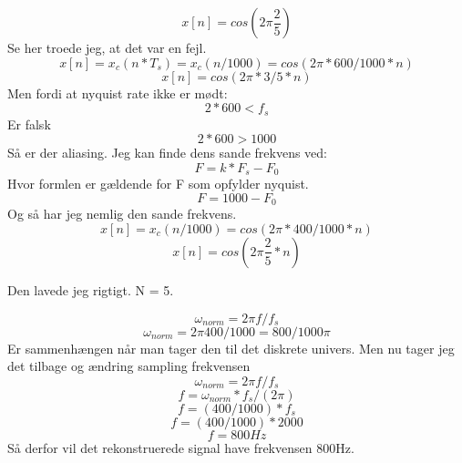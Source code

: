 \begin{rubrik}
\begin{eksamensOpgave}
    \end{eksamensOpgave}
    \begin{eksamensOpgave}
        \begin{UnderOpgave}
            \[x[n] = cos(2\pi \frac{2}{5})\]
            Se her troede jeg, at det var en fejl. 
            \[x[n] = x_c(n*T_s) = x_c(n/1000) = cos(2\pi * 600/1000 * n)\]
            \[x[n] = cos(2\pi*3/5 * n)\]
            Men fordi at nyquist rate ikke er mødt: 
            \[2 * 600 < f_s\]
            Er falsk
            \[2 * 600 > 1000\]
            Så er der aliasing. 
            Jeg kan finde dens sande frekvens ved: 
            \[F = k*F_s - F_0\]
            Hvor formlen er gældende for F som opfylder nyquist. 
            \[F = 1000 - F_0\]
            Og så har jeg nemlig den sande frekvens.
            \[x[n] = x_c(n/1000) = cos(2\pi * 400/1000 * n)\]
            \[x[n] = cos(2\pi \frac{2}{5} * n)\]
        \end{UnderOpgave}
        \begin{UnderOpgave}
            Den lavede jeg rigtigt. N = 5.
        \end{UnderOpgave}
        \begin{UnderOpgave}
            \[\omega_{norm} = 2\pi f/f_s\]
            \[\omega_{norm} = 2\pi 400/1000 = 800/1000\pi\]
            Er sammenhængen når man tager den til det diskrete univers. 
            Men nu tager jeg det tilbage og ændring sampling frekvensen
            \[\omega_{norm} = 2\pi f/f_s\]
            \[f = \omega_{norm}*f_s/(2\pi)\]
            \[f = (400/1000)*f_s\]
            \[f = (400/1000)*2000\]
            \[f = 800Hz\]
            Så derfor vil det rekonstruerede signal have frekvensen 800Hz. 
            
        \end{UnderOpgave}
        
    \end{eksamensOpgave}
    \begin{eksamensOpgave}
        
    \end{eksamensOpgave}
    
\end{rubrik}\setcounter{eksamensOpgave}{0}

